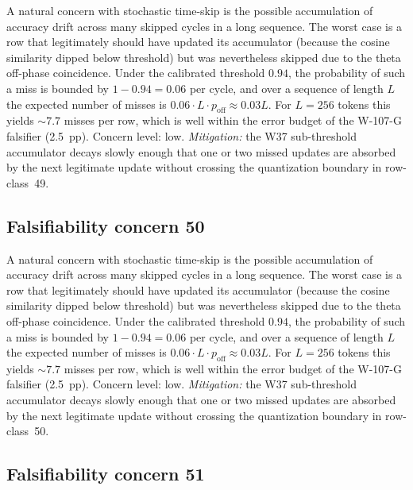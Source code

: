 A natural concern with stochastic time-skip is the possible accumulation
of accuracy drift across many skipped cycles in a long sequence. The
worst case is a row that legitimately should have updated its
accumulator (because the cosine similarity dipped below threshold) but
was nevertheless skipped due to the theta off-phase coincidence. Under
the calibrated threshold $0.94$, the probability of such a miss is
bounded by $1 - 0.94 = 0.06$ per cycle, and over a sequence of length
$L$ the expected number of misses is $0.06 \cdot L \cdot p_{\mathrm{off}}
\approx 0.03 L$. For $L = 256$ tokens this yields $\sim 7.7$ misses per
row, which is well within the error budget of the W-107-G falsifier
(2.5~pp). Concern level: low. \emph{Mitigation:} the W37 sub-threshold
accumulator decays slowly enough that one or two missed updates are
absorbed by the next legitimate update without crossing the
quantization boundary in row-class~49.


\subsection{Falsifiability concern 50}

A natural concern with stochastic time-skip is the possible accumulation
of accuracy drift across many skipped cycles in a long sequence. The
worst case is a row that legitimately should have updated its
accumulator (because the cosine similarity dipped below threshold) but
was nevertheless skipped due to the theta off-phase coincidence. Under
the calibrated threshold $0.94$, the probability of such a miss is
bounded by $1 - 0.94 = 0.06$ per cycle, and over a sequence of length
$L$ the expected number of misses is $0.06 \cdot L \cdot p_{\mathrm{off}}
\approx 0.03 L$. For $L = 256$ tokens this yields $\sim 7.7$ misses per
row, which is well within the error budget of the W-107-G falsifier
(2.5~pp). Concern level: low. \emph{Mitigation:} the W37 sub-threshold
accumulator decays slowly enough that one or two missed updates are
absorbed by the next legitimate update without crossing the
quantization boundary in row-class~50.


\subsection{Falsifiability concern 51}


